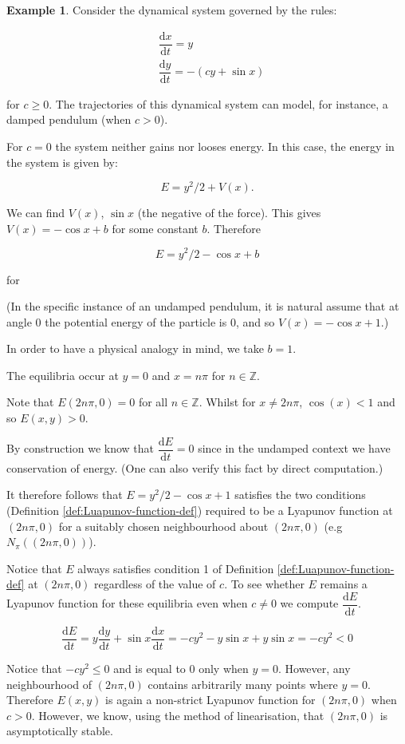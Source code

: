 \documentclass[
  a4paper,
  oneside,
  final]{krantz}
\newcommand{\Z}{\mathbb{Z}}
\renewcommand{\d}{\mathrm{d}}
\newcommand{\der}[2]{\dfrac{\d #1}{\d #2}}
\theoremstyle{definition}
\theoremstyle{definition}
\newtheorem{example}{Example}[chapter]
\theoremstyle{definition}
\theoremstyle{definition}
\theoremstyle{remark}
\begin{document}
\begin{example}
\protect\hypertarget{exm:Lyapunov-stability-examples}{}\label{exm:Lyapunov-stability-examples}Consider the dynamical system governed by the rules:

\begin{align*}
  &\der{x}{t} = y \\
  &\der{y}{t}  =  -(cy + \sin x)
\end{align*}

for \(c \ge 0\). The trajectories of this dynamical system can model, for instance, a damped pendulum (when \(c>0\)).

For \(c=0\) the system neither gains nor looses energy. In this case, the energy in the system is given by:

\[ E = y^2/2 + V(x).\]

We can find \(V(x)\), \(\sin x\) (the negative of the force). This gives \(V(x) = -\cos x + b\) for some constant \(b\). Therefore

\[E = y^2/2 - \cos x + b\]

for

(In the specific instance of an undamped pendulum, it is natural assume that at angle \(0\) the potential energy of the particle is \(0\), and so \(V(x) = -\cos x + 1\).)

In order to have a physical analogy in mind, we take \(b=1\).

The equilibria occur at \(y = 0\) and \(x = n \pi\) for \(n \in \Z\).

Note that \(E(2n \pi,0) = 0\) for all \(n \in \Z\). Whilst for \(x \ne 2n\pi\), \(\cos(x)<1\) and so \(E(x,y)>0\).

By construction we know that \(\der{E}{t} = 0\) since in the undamped context we have conservation of energy. (One can also verify this fact by direct computation.)

It therefore follows that \(E = y^2/2 - \cos x + 1\) satisfies the two conditions (Definition \ref{def:Luapunov-function-def}) required to be a Lyapunov function at \((2n\pi,0)\) for a suitably chosen neighbourhood about \((2n\pi,0)\) (e.g \(N_{\pi}((2n\pi,0))\)).

Notice that \(E\) always satisfies condition 1 of Definition \ref{def:Luapunov-function-def} at \((2n\pi,0)\) regardless of the value of \(c\). To see whether \(E\) remains a Lyapunov function for these equilibria even when \(c \ne 0\) we compute \(\der{E}{t}\).

\[\der{E}{t} = y \der{y}{t} + \sin x \der{x}{t} = -cy^2 - y \sin x + y \sin x = -cy^2 <0\]

Notice that \(-cy^2 \le 0\) and is equal to \(0\) only when \(y = 0\). However, any neighbourhood of \((2n\pi,0)\) contains arbitrarily many points where \(y=0\). Therefore \(E(x,y)\) is again a non-strict Lyapunov function for \((2n\pi, 0)\) when \(c>0\). However, we know, using the method of linearisation, that \((2n\pi, 0)\) is asymptotically stable.
\end{example}
\end{document}
